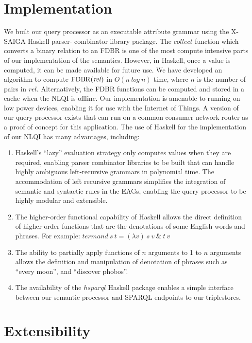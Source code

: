 \documentclass[../main.tex]{subfiles}
\begin{document}
\begin{refsection}
\section{Implementation}
\label{ext:implementation}
We built our query processor as an executable attribute grammar using the X-SAIGA Haskell parser-
combinator library package. %
The $\mathit{collect}$ function which converts a binary relation to an FDBR is one of the most
compute intensive parts of our implementation of the semantics. However, in Haskell, once a value is
computed, it can be made available for future use. We have developed an algorithm to compute
$\mathrm{FDBR}({\mathit{rel}})$ in $O(n\ log\ n)$ time, where $n$ is the number of pairs in $\mathit{rel}$.
Alternatively, the FDBR functions can be computed and stored in a cache when the NLQI is offline.
Our implementation is amenable to running on low power devices, enabling it for use with the Internet of Things. A version of our query processor exists that can run on a common consumer network router as a proof of concept for this application.
The use of Haskell for the implementation of our NLQI has many advantages, including:
\begin{enumerate}
	\setlength\itemsep{0em}
	\item Haskell's ``lazy'' evaluation strategy only computes values when they are required, enabling parser combinator
	libraries to be built that can handle highly ambiguous left-recursive grammars in polynomial time. The accommodation of left recursive
	grammars simplifies the integration of semantic and syntactic rules in the EAGs, enabling the query processor to be highly modular and extensible.
	\item The higher-order functional capability of Haskell allows the direct definition of higher-order
	functions that are the denotations of some English words and phrases. For example: $ \mathit{termand}\ s\ t = (\lambda v)\ s\ v\ \&\ t\ v  $
	\item The ability to partially apply functions of $n$ arguments to 1 to $n$ arguments allows the
	definition and manipulation of denotation of phrases such as ``every moon'', and ``discover
	phobos''.
	\item The availability of the $\mathit{hsparql}$ \cite{hsparql} Haskell package enables a simple interface between our
	semantic processor and SPARQL endpoints to our triplestores.
\end{enumerate}

\section{Extensibility}
\label{ext:extensible}


\end{refsection}
\end{document}
